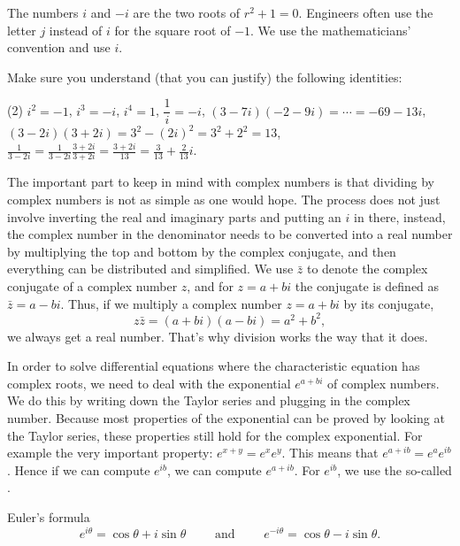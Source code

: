 The numbers
$i$ and $-i$ are the two roots of $r^2 + 1 = 0$.
Engineers often use the letter $j$ instead of $i$ for the square
root of $-1$.  We use the mathematicians' convention and use $i$.

\begin{exercise}
Make sure you understand (that you can justify)
the following identities:
\begin{tasks}(2)
\task $i^2 = -1$, $i^3 = -i$, $i^4 = 1$,
\task $\dfrac{1}{i} = -i$,
\task $(3-7i)(-2-9i) = \cdots = -69-13i$,
\task $(3-2i)(3+2i) = 3^2 - {(2i)}^2 = 3^2 + 2^2 = 13$,
\task $\frac{1}{3-2i} = \frac{1}{3-2i} \frac{3+2i}{3+2i} = \frac{3+2i}{13}
= \frac{3}{13}+\frac{2}{13}i$.
\end{tasks}
\end{exercise}

The important part to keep in mind with complex numbers is that dividing by complex numbers is not as simple as one would hope. The process does not just involve inverting the real and imaginary parts and putting an $i$ in there, instead, the complex number in the denominator needs to be converted into a real number by multiplying the top and bottom by the complex conjugate, and then everything can be distributed and simplified. We use $\bar{z}$ to denote the complex conjugate of a complex number $z$, and for $z = a+bi$ the conjugate is defined as $\bar{z} = a - bi$. Thus, if we multiply a complex number $z = a+bi$ by its conjugate, \[ z\bar{z} = (a+bi)(a-bi) = a^2 + b^2, \] we always get a real number. That's why division works the way that it does.

\pagebreak[2]
In order to solve differential equations where the characteristic equation has complex roots, we need to deal with the exponential $e^{a+bi}$ of complex numbers. 
We do this by writing down the Taylor series and plugging in the complex
number.  Because most properties of the exponential can be proved by looking
at the Taylor series, these
properties still hold for the complex
exponential.  For example the very important property: $e^{x+y} = e^x e^y$.  This means that
$e^{a+ib} = e^a e^{ib}$.  Hence if we can compute $e^{ib}$, we can
compute $e^{a+ib}$.  For $e^{ib}$, we use the so-called
\emph{}.

\begin{theorem1}[eulersformula]{Euler's formula} 
\begin{equation*}
e^{i \theta} = \cos \theta + i \sin \theta
\qquad \text{ and } \qquad
e^{- i \theta} = \cos \theta - i \sin \theta .
\end{equation*}
\end{theorem1}

